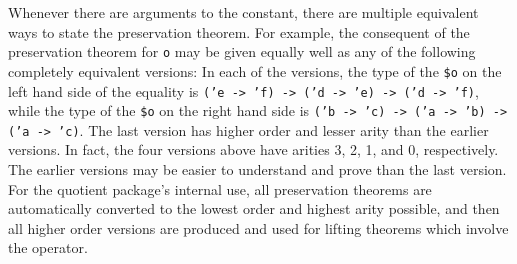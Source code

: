 \documentclass[envcountsame,runningheads]{llncs}
\begin{document}
Whenever there are arguments to the constant, there are
multiple equivalent ways to state the
preservation
theorem.
For example, the consequent of the
preservation
theorem for {\tt o}
may be given
equally well as any of the following completely equivalent versions:
In each of the versions, the type of the {\tt \$o} on the left hand side
of the equality
is {\tt ('e -> 'f) -> ('d -> 'e) -> ('d -> 'f)},
while the type of the {\tt \$o} on the right hand side
is {\tt ('b -> 'c) -> ('a -> 'b) -> ('a -> 'c)}.
The last version has higher order and lesser arity than the
earlier versions.  In fact, the four versions above have arities
3, 2, 1, and 0, respectively.
The earlier versions may be easier to understand and prove than the
last version. 
For the quotient package's internal use, all preservation
theorems are automatically converted to the lowest order and highest
arity possible, and then all higher order versions are produced
and used for lifting theorems
which involve the operator.

\vfill
\end{document}

